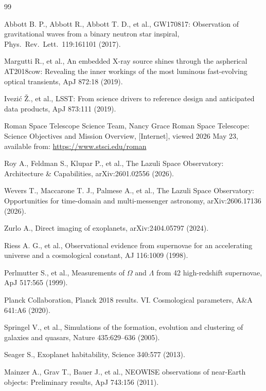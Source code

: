 \begin{thebibliography}{99}\small

Abbott B. P., Abbott R., Abbott T. D., et al., GW170817: Observation of gravitational waves from a binary neutron star inspiral, Phys.\ Rev.\ Lett.\ 119:161101 (2017).

Margutti R., et al., An embedded X-ray source shines through the aspherical AT2018cow: Revealing the inner workings of the most luminous fast-evolving optical transients, ApJ 872:18 (2019).

Ivezi\'{c} \v{Z}., et al., LSST: From science drivers to reference design and anticipated data products, ApJ 873:111 (2019).

Roman Space Telescope Science Team, Nancy Grace Roman Space Telescope: Science Objectives and Mission Overview, [Internet], viewed 2026 May 23, available from: \url{https://www.stsci.edu/roman}

Roy A., Feldman S., Klupar P., et al.,
The Lazuli Space Observatory: Architecture \& Capabilities,
arXiv:2601.02556 (2026).

Wevers T., Maccarone T. J., Palmese A., et al.,
The Lazuli Space Observatory: Opportunities for time-domain and
multi-messenger astronomy,
arXiv:2606.17136 (2026).

Zurlo A., Direct imaging of exoplanets, arXiv:2404.05797 (2024).

Riess A. G., et al., Observational evidence from supernovae for an accelerating universe and a cosmological constant, AJ 116:1009 (1998).

Perlmutter S., et al., Measurements of $\Omega$ and $\Lambda$ from 42 high-redshift supernovae, ApJ 517:565 (1999).

Planck Collaboration, Planck 2018 results. VI. Cosmological parameters, A\&A 641:A6 (2020).

Springel V., et al., Simulations of the formation, evolution and clustering of galaxies and quasars, Nature 435:629--636 (2005).

Seager S., Exoplanet habitability, Science 340:577 (2013).

Mainzer A., Grav T., Bauer J., et al., NEOWISE observations of near-Earth objects: Preliminary results, ApJ 743:156 (2011).


\end{thebibliography}
